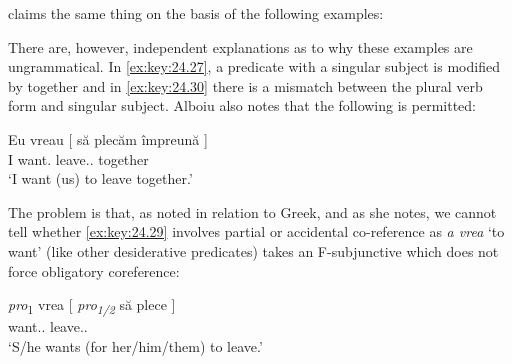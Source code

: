 \documentclass[output=paper]{langsci/langscibook}
\begin{document}
\ea%
    \label{ex:key:24.26} 
	\z
\z

\citet[10]{Alboiu2007} claims the same thing on the basis of the following
examples:

\ea%
\label{ex:key:24.27}
\z

\ea%
\label{ex:key:24.28}
\z

There are, however, independent explanations as to why these examples are
ungrammatical. In \eqref{ex:key:24.27}, a predicate with a singular subject is modified by
together and in \eqref{ex:key:24.30} there is a mismatch between the plural verb form and
singular subject. Alboiu also notes that the following is permitted:\newpage

\ea%
\label{ex:key:24.29}  \citep[10]{Alboiu2007}
    \sn
	\gll Eu vreau     [ să   plecăm      împreună ]\\
    I   want.\Fsg{} {} \Sbjv{}   leave.\Sbjv{}.\Fpl{}   together\\
	\glt ‘I want (us) to leave together.’
\z

The problem is that, as noted in relation to Greek, and as she notes, we cannot
tell whether \eqref{ex:key:24.29} involves partial  or accidental co-reference as
\emph{a vrea} ‘to want’ (like other desiderative predicates) takes an
F-subjunctive which does not force obligatory coreference:

\ea%
    \label{ex:key:24.30}  \citep[11]{Alboiu2007}
    \sn
	\gll \emph{pro}\textsubscript{1}   vrea       [ \emph{pro\textsubscript{1/2}} să   plece ]\\
        {} want.\Prs.\Tsg{}  {} {} \Sbjv{}   leave.\Sbjv{}.\Third{}\\
	\glt ‘S/he wants (for her/him/them) to leave.’
\z
\end{document}
